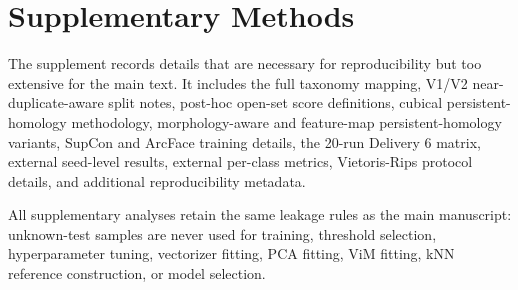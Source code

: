 \section{Supplementary Methods}

The supplement records details that are necessary for reproducibility but too extensive for the main text. It includes the full taxonomy mapping, V1/V2 near-duplicate-aware split notes, post-hoc open-set score definitions, cubical persistent-homology methodology, morphology-aware and feature-map persistent-homology variants, SupCon and ArcFace training details, the 20-run Delivery 6 matrix, external seed-level results, external per-class metrics, Vietoris-Rips protocol details, and additional reproducibility metadata.

All supplementary analyses retain the same leakage rules as the main manuscript: unknown-test samples are never used for training, threshold selection, hyperparameter tuning, vectorizer fitting, PCA fitting, ViM fitting, kNN reference construction, or model selection.
